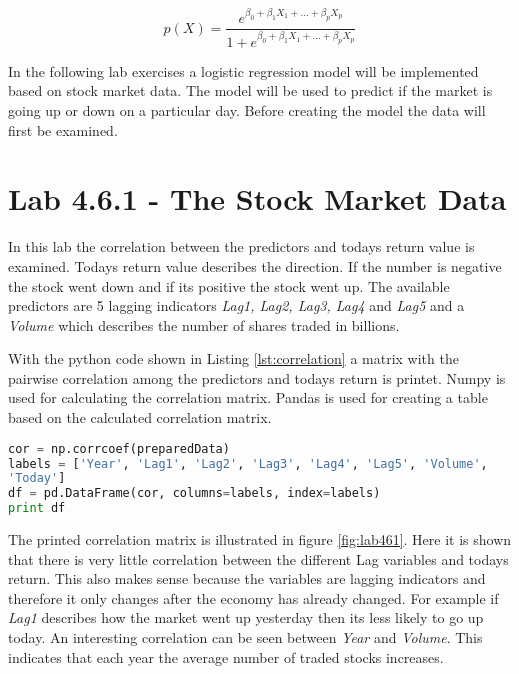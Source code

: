 
\begin{equation}
	p(X) = \dfrac{e^{\beta_0 + \beta_1 X_1 + ... + \beta_p X_p}}{1 + e^{\beta_0 + \beta_1 X_1 + ... + \beta_p X_p}}
\end{equation}


In the following lab exercises a logistic regression model will be implemented based on stock market data. The model will be used to predict if the market is going up or down on a particular day. Before creating the model the data will first be examined.

\section{Lab 4.6.1 - The Stock Market Data}
In this lab the correlation between the predictors and todays return value is examined. Todays return value describes the direction. If the number is negative the stock went down and if its positive the stock went up. The available predictors are 5 lagging indicators \emph{Lag1, Lag2, Lag3, Lag4} and \emph{Lag5} and a \emph{Volume} which describes the number of shares traded in billions.

With the python code shown in Listing \ref{lst:correlation} a matrix with the pairwise correlation among the predictors and todays return is printet. Numpy is used for calculating the correlation matrix. Pandas is used for creating a table based on the calculated correlation matrix.
\begin{lstlisting}[language=Python, label=lst:correlation, caption=Print correlation matrix]
cor = np.corrcoef(preparedData)
labels = ['Year', 'Lag1', 'Lag2', 'Lag3', 'Lag4', 'Lag5', 'Volume', 
'Today']
df = pd.DataFrame(cor, columns=labels, index=labels)
print df
\end{lstlisting}

The printed correlation matrix is illustrated in figure \ref{fig:lab461}. Here it is shown that there is very little correlation between the different Lag variables and todays return. This also makes sense because the variables are lagging indicators and therefore it only changes after the economy has already changed. For example if \emph{Lag1} describes how the market went up yesterday then its less likely to go up today. An interesting correlation can be seen between \emph{Year} and \emph{Volume}. This indicates that each year the average number of traded stocks increases. 

